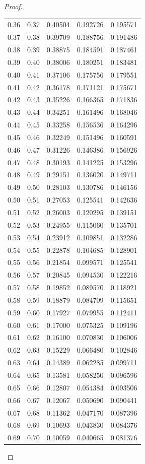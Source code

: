 \documentclass[11pt,a4paper]{article}
\theoremstyle{remark}
\numberwithin{equation}{section}
\begin{document}
\begin{proof}
\begin{longtable}{rrrrr}
0.36 & 0.37 & 0.40504 & 0.192726 & 0.195571\\
0.37 & 0.38 & 0.39709 & 0.188756 & 0.191486\\
0.38 & 0.39 & 0.38875 & 0.184591 & 0.187461\\
0.39 & 0.40 & 0.38006 & 0.180251 & 0.183481\\
0.40 & 0.41 & 0.37106 & 0.175756 & 0.179551\\
0.41 & 0.42 & 0.36178 & 0.171121 & 0.175671\\
0.42 & 0.43 & 0.35226 & 0.166365 & 0.171836\\
0.43 & 0.44 & 0.34251 & 0.161496 & 0.168046\\
0.44 & 0.45 & 0.33258 & 0.156536 & 0.164296\\
0.45 & 0.46 & 0.32249 & 0.151496 & 0.160591\\
0.46 & 0.47 & 0.31226 & 0.146386 & 0.156926\\
0.47 & 0.48 & 0.30193 & 0.141225 & 0.153296\\
0.48 & 0.49 & 0.29151 & 0.136020 & 0.149711\\
0.49 & 0.50 & 0.28103 & 0.130786 & 0.146156\\
0.50 & 0.51 & 0.27053 & 0.125541 & 0.142636\\
0.51 & 0.52 & 0.26003 & 0.120295 & 0.139151\\
0.52 & 0.53 & 0.24955 & 0.115060 & 0.135701\\
0.53 & 0.54 & 0.23912 & 0.109851 & 0.132286\\
0.54 & 0.55 & 0.22878 & 0.104685 & 0.128901\\
0.55 & 0.56 & 0.21854 & 0.099571 & 0.125541\\
0.56 & 0.57 & 0.20845 & 0.094530 & 0.122216\\
0.57 & 0.58 & 0.19852 & 0.089570 & 0.118921\\
0.58 & 0.59 & 0.18879 & 0.084709 & 0.115651\\
0.59 & 0.60 & 0.17927 & 0.079955 & 0.112411\\
0.60 & 0.61 & 0.17000 & 0.075325 & 0.109196\\
0.61 & 0.62 & 0.16100 & 0.070830 & 0.106006\\
0.62 & 0.63 & 0.15229 & 0.066480 & 0.102846\\
0.63 & 0.64 & 0.14389 & 0.062285 & 0.099711\\
0.64 & 0.65 & 0.13581 & 0.058250 & 0.096596\\
0.65 & 0.66 & 0.12807 & 0.054384 & 0.093506\\
0.66 & 0.67 & 0.12067 & 0.050690 & 0.090441\\
0.67 & 0.68 & 0.11362 & 0.047170 & 0.087396\\
0.68 & 0.69 & 0.10693 & 0.043830 & 0.084376\\
0.69 & 0.70 & 0.10059 & 0.040665 & 0.081376\\
\bottomrule
\end{longtable}



\end{proof}
\end{document}
